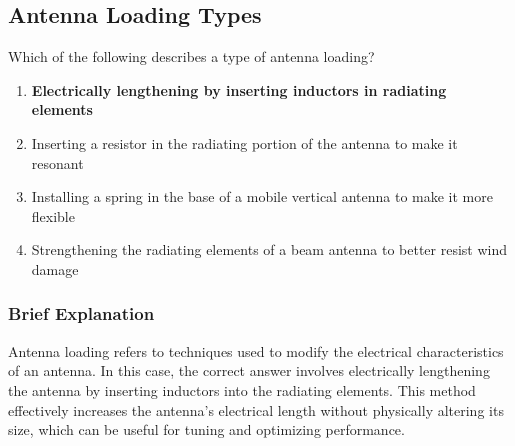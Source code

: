 \subsection{Antenna Loading Types}
\label{T9A02}

\begin{tcolorbox}[colback=gray!10!white,colframe=black!75!black,title=T9A02]
Which of the following describes a type of antenna loading?
\begin{enumerate}[noitemsep]
    \item \textbf{Electrically lengthening by inserting inductors in radiating elements}
    \item Inserting a resistor in the radiating portion of the antenna to make it resonant
    \item Installing a spring in the base of a mobile vertical antenna to make it more flexible
    \item Strengthening the radiating elements of a beam antenna to better resist wind damage
\end{enumerate}
\end{tcolorbox}

\subsubsection*{Brief Explanation}
Antenna loading refers to techniques used to modify the electrical characteristics of an antenna. In this case, the correct answer involves electrically lengthening the antenna by inserting inductors into the radiating elements. This method effectively increases the antenna's electrical length without physically altering its size, which can be useful for tuning and optimizing performance.